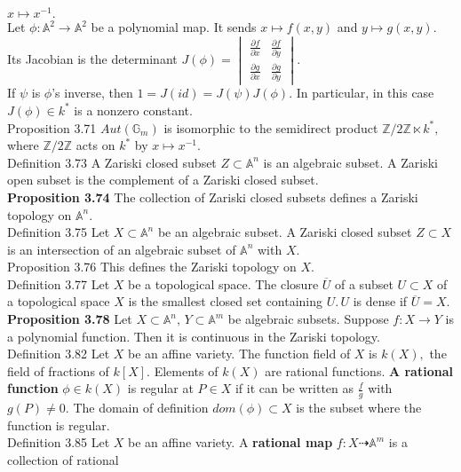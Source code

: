 \documentclass[8pt]{extarticle}
\begin{document}
$x \mapsto x^{-1}.$\\
Let $\phi: \mathbb{A}^2 \rightarrow \mathbb{A}^2$ be a polynomial map. It sends $x \mapsto f(x,y)$ and $y\mapsto g(x,y).$ Its Jacobian is the determinant $J(\phi)=\begin{vmatrix}
\frac{\partial f}{\partial x} & \frac{\partial f}{\partial y}\\
\frac{\partial g}{\partial x} & \frac{\partial g}{\partial y}
\end{vmatrix}.$\\
If $\psi$ is $\phi$'s inverse, then $1=J(id)=J(\psi)J(\phi).$
In particular, in this case $J(\phi) \in k^*$ is a nonzero constant.\\
Proposition 3.71 $Aut(\mathbb{G}_m)$ is isomorphic to the semidirect product $\mathbb{Z}/2\mathbb{Z}\ltimes k^*,$ where $\mathbb{Z}/2\mathbb{Z}$ acts on $k^*$ by $x\mapsto x^{-1}.$\\
Definition 3.73 A Zariski closed subset $Z \subset \mathbb{A}^n$ is an algebraic subset. A Zariski open subset is the complement of a Zariski closed subset.\\
\textbf{Proposition 3.74} The collection of Zariski closed subsets defines a Zariski topology on $\mathbb{A}^n.$\\
Definition 3.75 Let $X \subset \mathbb{A}^n$ be an algebraic subset. A Zariski closed subset $Z \subset X$ is an intersection of an algebraic subset of $\mathbb{A}^n$ with $X.$\\
Proposition 3.76 This defines the Zariski topology on $X.$\\
Definition 3.77 Let $X$ be a topological space. The closure $\overline{U}$ of a subset $U \subset X$ of a topological space $X$ is the smallest closed set containing $U.\,U$ is dense if $\overline{U} = X.$\\
\textbf{Proposition 3.78} Let $X \subset \mathbb{A}^n,\,Y \subset \mathbb{A}^m$ be algebraic subsets. Suppose $f: X \rightarrow Y$ is a polynomial function. Then it is continuous in the Zariski topology.\\
Definition 3.82 Let $X$ be an affine variety. The function field of $X$ is $k(X),$ the field of fractions of $k[X].$ Elements of $k(X)$ are rational functions. \textbf{A rational function} $\phi \in k(X)$ is regular at $P \in X$ if it can be written as $\frac{f}{g}$ with $g(P) \neq 0.$ The domain of definition $dom(\phi) \subset X$ is the subset where the function is regular.\\
Definition 3.85 Let $X$ be an affine variety. A \textbf{rational map} $f: X \dashrightarrow \mathbb{A}^m$ is a collection of rational
\end{document}
